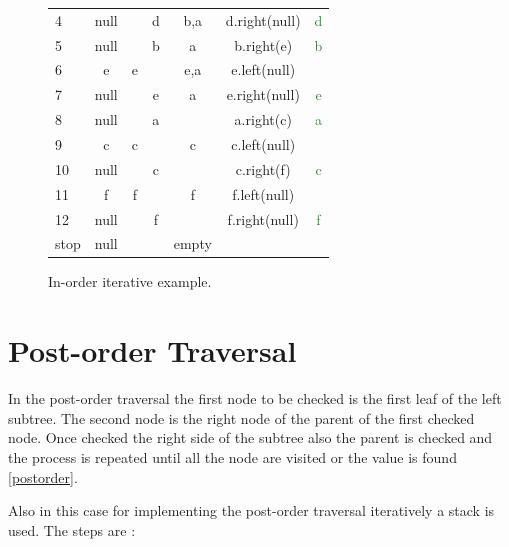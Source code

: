 \begin{figure}[H]
\begin{tabular}{ l|c|c|c|c|c|c }
 4  & null & & d & b,a & d.right(\textcolor{BrickRed}{null}) & \textcolor{ForestGreen}{d} \\
 
 5  & null & & b & a & b.right(\textcolor{BrickRed}{e}) & \textcolor{ForestGreen}{b} \\
 
 6  & e & e &  & e,a & e.left(\textcolor{BrickRed}{null}) & \\
 
 7  & null & & e & a & e.right(\textcolor{BrickRed}{null}) & \textcolor{ForestGreen}{e} \\
 
 8  & null & & a & & a.right(\textcolor{BrickRed}{c}) & \textcolor{ForestGreen}{a} \\
 
 9  & c & c &  & c & c.left(\textcolor{BrickRed}{null}) & \\
 
 10 & null & & c &  & c.right(\textcolor{BrickRed}{f}) & \textcolor{ForestGreen}{c} \\
 
 11 & f & f &  & f & f.left(\textcolor{BrickRed}{null}) & \\
 
 12 & null & & f & & f.right(\textcolor{BrickRed}{null}) & \textcolor{ForestGreen}{f} \\

\textcolor{BrickRed}{stop} & \textcolor{BrickRed}{null} &  & & \textcolor{BrickRed}{empty} & & \\
\end{tabular}
\caption[In-order iterative example.]{In-order iterative example.}
\label{appendixtrees_2}
\end{figure}

\section{Post-order Traversal}
\label{postorderappendix}
In the post-order traversal the first node to be checked is the first leaf of the left subtree. The second node is the right node of the parent of the first checked node. Once checked the right side of the subtree also the parent is checked and the process is repeated until all the node are visited or the value is found \ref{postorder}. 

Also in this case for implementing the post-order traversal iteratively a stack is used. The steps are \cite{wikitreestrav}:

